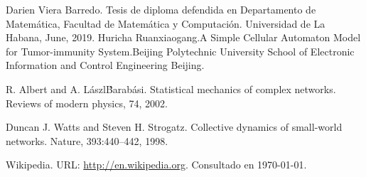 \documentclass[12pt]{amsart}
\begin{document}
\begin{thebibliography}{99}

 Darien Viera Barredo. Tesis de diploma defendida en Departamento de Matem\'atica, Facultad de Matem\'atica y Computaci\'on.  Universidad de La Habana, June, 2019. 
 Huricha Ruanxiaogang.A Simple Cellular Automaton Model for Tumor-immunity System.Beijing Polytechnic University School of Electronic Information and Control Engineering Beijing.

 R. Albert and A. L\'aszl\' Barab\'asi. Statistical mechanics of complex networks. Reviews of
modern physics, 74, 2002.

 Duncan J. Watts and Steven H. Strogatz. Collective dynamics of small-world networks.
Nature, 393:440–442, 1998.
	
 Wikipedia. URL: \href{http://en.wikipedia.org}{http://en.wikipedia.org}.
Consultado en \today.

\end{thebibliography}
\smallskip
\smallskip
\end{document}
